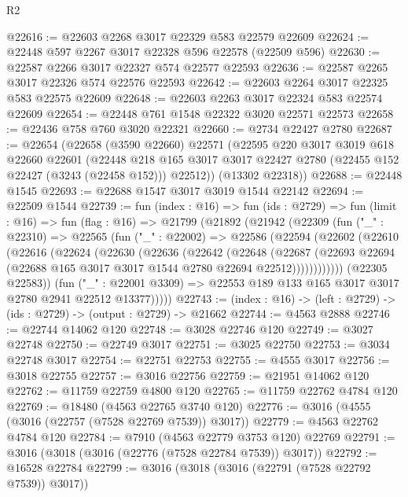 \begin{lexlean}{R2}
\begin{coremodule}
@22616 := @22603 @2268 @3017 @22329 @583 @22579 @22609
@22624 := @22448 @597 @2267 @3017 @22328 @596 @22578 (@22509 @596)
@22630 := @22587 @2266 @3017 @22327 @574 @22577 @22593
@22636 := @22587 @2265 @3017 @22326 @574 @22576 @22593
@22642 := @22603 @2264 @3017 @22325 @583 @22575 @22609
@22648 := @22603 @2263 @3017 @22324 @583 @22574 @22609
@22654 := @22448 @761 @1548 @22322 @3020 @22571 @22573
@22658 := @22436 @758 @760 @3020 @22321
@22660 := @2734 @22427 @2780
@22687 := @22654
    (@22658
      (@3590 @22660)
      @22571
      (@22595
        @220
        @3017
        @3019
        @618
        @22660
        @22601
        (@22448
          @218
          @165
          @3017
          @3017
          @22427
          @2780
          (@22455 @152 @22427 (@3243 (@22458 @152)))
          @22512))
      (@13302 @22318))
@22688 := @22448 @1545
@22693 := @22688 @1547 @3017 @3019 @1544 @22142
@22694 := @22509 @1544
@22739 := fun (index : @16) =>
  fun (ids : @2729) =>
  fun (limit : @16) =>
  fun (flag : @16) =>
  @21799
    (@21892
      (@21942
        (@22309
          (fun ("_" : @22310) =>
          @22565
            (fun ("_" : @22002) =>
            @22586
              (@22594
                (@22602
                  (@22610
                    (@22616
                      (@22624
                        (@22630
                          (@22636
                            (@22642
                              (@22648
                                (@22687
                                  (@22693
                                    @22694
                                    (@22688 @165 @3017 @3017 @1544 @2780 @22694 @22512))))))))))))
              (@22305 @22583))
            (fun ("_" : @22001 @3309) =>
            @22553 @189 @133 @165 @3017 @3017 @2780 @2941 @22512 @13377)))))
@22743 := (index : @16) -> (left : @2729) -> (ids : @2729) -> (output : @2729) -> @21662
@22744 := @4563 @2888
@22746 := @22744 @14062 @120
@22748 := @3028 @22746 @120
@22749 := @3027 @22748
@22750 := @22749 @3017
@22751 := @3025 @22750
@22753 := @3034 @22748 @3017
@22754 := @22751 @22753
@22755 := @4555 @3017
@22756 := @3018 @22755
@22757 := @3016 @22756
@22759 := @21951 @14062 @120
@22762 := @11759 @22759 @4800 @120
@22765 := @11759 @22762 @4784 @120
@22769 := @18480 (@4563 @22765 @3740 @120)
@22776 := @3016 (@4555 (@3016 (@22757 (@7528 @22769 @7539)) @3017))
@22779 := @4563 @22762 @4784 @120
@22784 := @7910 (@4563 @22779 @3753 @120) @22769
@22791 := @3016 (@3018 (@3016 (@22776 (@7528 @22784 @7539)) @3017))
@22792 := @16528 @22784
@22799 := @3016 (@3018 (@3016 (@22791 (@7528 @22792 @7539)) @3017))

\end{coremodule}
\end{lexlean}
